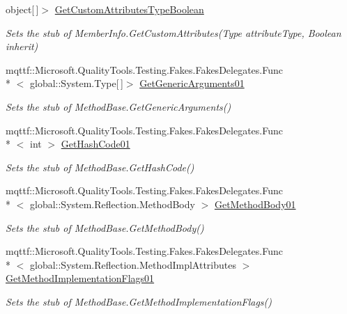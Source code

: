 \begin{DoxyCompactItemize}
object\mbox{[}$\,$\mbox{]}$>$ \hyperlink{class_system_1_1_reflection_1_1_fakes_1_1_stub_method_base_a466e1057cb0460e6d1f2fa48937439fb}{Get\-Custom\-Attributes\-Type\-Boolean}
\begin{DoxyCompactList}\small\item\em Sets the stub of Member\-Info.\-Get\-Custom\-Attributes(\-Type attribute\-Type, Boolean inherit)\end{DoxyCompactList}\item 
mqttf\-::\-Microsoft.\-Quality\-Tools.\-Testing.\-Fakes.\-Fakes\-Delegates.\-Func\\*
$<$ global\-::\-System.\-Type\mbox{[}$\,$\mbox{]}$>$ \hyperlink{class_system_1_1_reflection_1_1_fakes_1_1_stub_method_base_a936fd9ec42c642ff201bb389276145c6}{Get\-Generic\-Arguments01}
\begin{DoxyCompactList}\small\item\em Sets the stub of Method\-Base.\-Get\-Generic\-Arguments()\end{DoxyCompactList}\item 
mqttf\-::\-Microsoft.\-Quality\-Tools.\-Testing.\-Fakes.\-Fakes\-Delegates.\-Func\\*
$<$ int $>$ \hyperlink{class_system_1_1_reflection_1_1_fakes_1_1_stub_method_base_a19f244ada57d208a2fef39ebb66ec6ab}{Get\-Hash\-Code01}
\begin{DoxyCompactList}\small\item\em Sets the stub of Method\-Base.\-Get\-Hash\-Code()\end{DoxyCompactList}\item 
mqttf\-::\-Microsoft.\-Quality\-Tools.\-Testing.\-Fakes.\-Fakes\-Delegates.\-Func\\*
$<$ global\-::\-System.\-Reflection.\-Method\-Body $>$ \hyperlink{class_system_1_1_reflection_1_1_fakes_1_1_stub_method_base_aa656cd88a3dcf46e0dc0cdbb3816202d}{Get\-Method\-Body01}
\begin{DoxyCompactList}\small\item\em Sets the stub of Method\-Base.\-Get\-Method\-Body()\end{DoxyCompactList}\item 
mqttf\-::\-Microsoft.\-Quality\-Tools.\-Testing.\-Fakes.\-Fakes\-Delegates.\-Func\\*
$<$ global\-::\-System.\-Reflection.\-Method\-Impl\-Attributes $>$ \hyperlink{class_system_1_1_reflection_1_1_fakes_1_1_stub_method_base_aa4345f7b0b97ee51d66fde131804f545}{Get\-Method\-Implementation\-Flags01}
\begin{DoxyCompactList}\small\item\em Sets the stub of Method\-Base.\-Get\-Method\-Implementation\-Flags()\end{DoxyCompactList}\item 

\end{DoxyCompactItemize}
